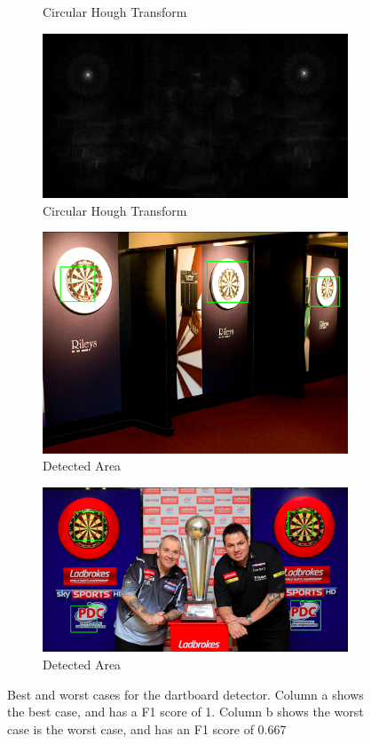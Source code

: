 \documentclass[conference]{IEEEtran}
\begin{document}
\begin{figure}[htb]
\begin{subfigure}{.5\linewidth}
  \caption*{Circular Hough Transform}
  \label{fig:sub1}
\end{subfigure}%
\begin{subfigure}{.5\linewidth}
  \centering
  \includegraphics[width=.9\linewidth]{images/task3/worstcirclehough.png}
  \caption*{Circular Hough Transform}
  \label{fig:sub2}
\end{subfigure}
\begin{subfigure}{.5\linewidth}
  \centering
  \includegraphics[width=.9\linewidth]{images/task3/bestresult.png}
  \caption{Detected Area}
  \label{fig:sub1}
\end{subfigure}%
\begin{subfigure}{.5\linewidth}
  \centering
  \includegraphics[width=.9\linewidth]{images/task3/worstresult.png}
  \caption{Detected Area}
  \label{fig:sub2}
\end{subfigure}
\caption{Best and worst cases for the dartboard detector. Column a shows the best case, and has a F1 score of 1.  Column b shows the worst case is the worst case, and has an F1 score of 0.667}
\end{figure}
\end{document}
